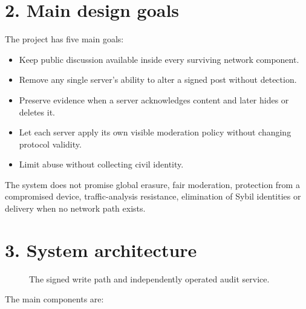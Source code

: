 \documentclass[12pt,a4paper]{article}
\begin{document}
\section*{2. Main design goals}
The project has five main goals:

\begin{itemize}
\item Keep public discussion available inside every surviving network component.


\item Remove any single server's ability to alter a signed post without detection.


\item Preserve evidence when a server acknowledges content and later hides or deletes it.


\item Let each server apply its own visible moderation policy without changing protocol validity.


\item Limit abuse without collecting civil identity.


\end{itemize}
The system does not promise global erasure, fair moderation, protection from a compromised device, traffic-analysis resistance, elimination of Sybil identities or delivery when no network path exists.

\section*{3. System architecture}

\begin{figure}[H]\centering
{}
\caption{The signed write path and independently operated audit service.}
\end{figure}
The main components are:
\end{document}
